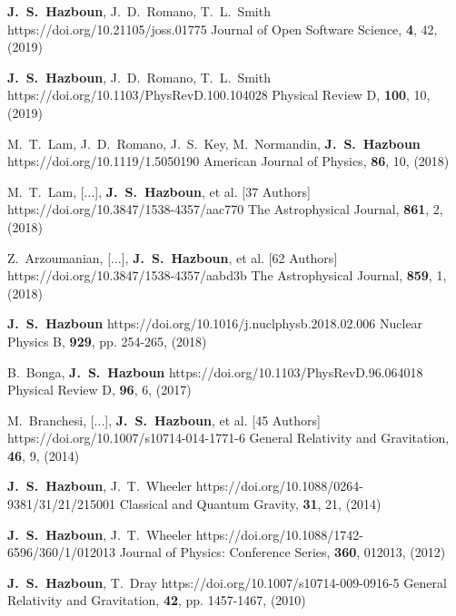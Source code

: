          {\textbf{J.~S.~Hazboun}, J.~D.~{Romano}, T.~L.~{Smith}}
         {https://doi.org/10.21105/joss.01775}
         {{Journal of Open Software Science}, \textbf{4}, 42, (2019)}

         {\textbf{J.~S.~Hazboun}, J.~D.~{Romano}, T.~L.~{Smith}}
         {https://doi.org/10.1103/PhysRevD.100.104028}
         {{Physical Review D}, \textbf{100}, 10, (2019)}

         {M.~T.~{Lam}, J.~D.~{Romano}, J.~S.~{Key}, M.~{Normandin}, \textbf{J.~S.~Hazboun}}
         {https://doi.org/10.1119/1.5050190}
         {{American Journal of Physics}, \textbf{86}, 10, (2018)}

         {M.~T.~{Lam}, [...], \textbf{J.~S.~{Hazboun}}, et al. [37 Authors]}
         {https://doi.org/10.3847/1538-4357/aac770}
         {{The Astrophysical Journal}, \textbf{861}, 2, (2018)}

         {Z.~{Arzoumanian}, [...], \textbf{J.~S.~{Hazboun}}, et al. [62 Authors]}
         {https://doi.org/10.3847/1538-4357/aabd3b}
         {{The Astrophysical Journal}, \textbf{859}, 1, (2018)}

         {\textbf{J.~S.~Hazboun}}
         {https://doi.org/10.1016/j.nuclphysb.2018.02.006}
         {{Nuclear Physics B}, \textbf{929}, pp. 254-265, (2018)}

         {B.~{Bonga}, \textbf{J.~S.~Hazboun}}
         {https://doi.org/10.1103/PhysRevD.96.064018}
         {{Physical Review D}, \textbf{96}, 6, (2017)}

         {M.~{Branchesi}, [...], \textbf{J.~S.~{Hazboun}}, et al. [45 Authors]}
         {https://doi.org/10.1007/s10714-014-1771-6}
         {{General Relativity and Gravitation}, \textbf{46}, 9, (2014)}

         {\textbf{J.~S.~Hazboun}, J.~T.~Wheeler}
         {https://doi.org/10.1088/0264-9381/31/21/215001}
         {{Classical and Quantum Gravity}, \textbf{31}, 21, (2014)}

         {\textbf{J.~S.~Hazboun}, J.~T.~{Wheeler}}
         {https://doi.org/10.1088/1742-6596/360/1/012013}
         {{Journal of Physics: Conference Series}, \textbf{360}, 012013, (2012)}

         {\textbf{J.~S.~Hazboun}, T.~{Dray}}
         {https://doi.org/10.1007/s10714-009-0916-5}
         {{General Relativity and Gravitation}, \textbf{42}, pp. 1457-1467, (2010)}

